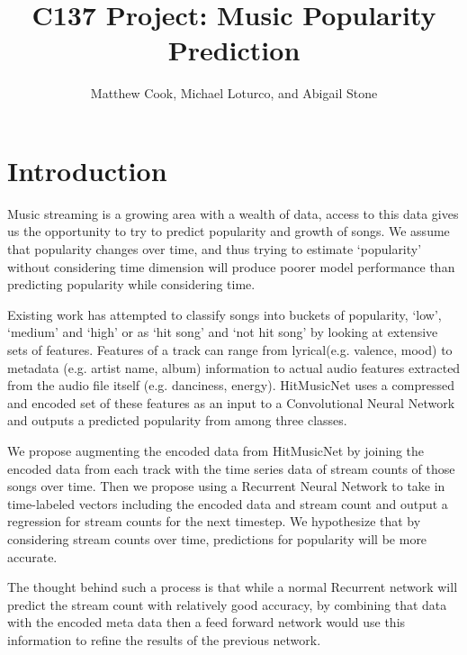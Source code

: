 \documentclass[11pt]{article}
\title{C137 Project: Music Popularity Prediction}
\author{Matthew Cook, Michael Loturco, and Abigail Stone}
\date{}
\begin{document}
\maketitle

\section{Introduction}

Music streaming is a growing area with a wealth of data, access to this data gives us the opportunity to try to predict popularity and growth of songs. We assume that popularity changes over time, and thus trying to estimate ‘popularity’ without considering time dimension will produce poorer model performance than predicting popularity while considering time. 


Existing work has attempted to classify songs into buckets of popularity, ‘low’, ‘medium’ and ‘high’ or as ‘hit song’ and ‘not hit song’ by looking at extensive sets of features. Features of a track can range from lyrical(e.g. valence, mood) to metadata (e.g. artist name, album) information to actual audio features extracted from the audio file itself (e.g. danciness, energy). HitMusicNet uses a compressed and encoded set of these features as an input to a Convolutional Neural Network and outputs a predicted popularity from among three classes. 


We propose augmenting the encoded data from HitMusicNet by joining the encoded data from each track with the time series data of stream counts of those songs over time. Then we propose using a Recurrent Neural Network to take in time-labeled vectors including the encoded data and stream count and output a regression for stream counts for the next timestep. We hypothesize that by considering stream counts over time, predictions for popularity will be more accurate. 

The thought behind such a process is that while a normal Recurrent network will predict the stream count with relatively good accuracy, by combining that data with the encoded meta data then a feed forward network would use this information to refine the results of the previous network.
\end{document}
